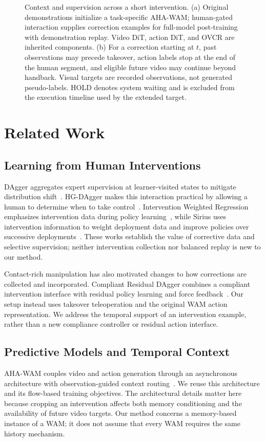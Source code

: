 \documentclass[letterpaper,10pt,conference]{ieeeconf}
\begin{document}
\begin{figure}[t]
\centering

\caption{Context and supervision across a short intervention. (a) Original demonstrations initialize a task-specific AHA-WAM; human-gated interaction supplies correction examples for full-model post-training with demonstration replay. Video DiT, action DiT, and OVCR are inherited components. (b) For a correction starting at $t$, past observations may precede takeover, action labels stop at the end of the human segment, and eligible future video may continue beyond handback. Visual targets are recorded observations, not generated pseudo-labels. HOLD denotes system waiting and is excluded from the execution timeline used by the extended target.}
\label{fig:method}
\end{figure}

\section{Related Work}
\subsection{Learning from Human Interventions}
DAgger aggregates expert supervision at learner-visited states to mitigate distribution shift~\cite{dagger}. HG-DAgger makes this interaction practical by allowing a human to determine when to take control~\cite{hgdagger}. Intervention Weighted Regression emphasizes intervention data during policy learning~\cite{iwr}, while Sirius uses intervention information to weight deployment data and improve policies over successive deployments~\cite{sirius}. These works establish the value of corrective data and selective supervision; neither intervention collection nor balanced replay is new to our method.

Contact-rich manipulation has also motivated changes to how corrections are collected and incorporated. Compliant Residual DAgger combines a compliant intervention interface with residual policy learning and force feedback~\cite{crdagger}. Our setup instead uses takeover teleoperation and the original WAM action representation. We address the temporal support of an intervention example, rather than a new compliance controller or residual action interface.

\subsection{Predictive Models and Temporal Context}
AHA-WAM couples video and action generation through an asynchronous architecture with observation-guided context routing~\cite{ahawam}. We reuse this architecture and its flow-based training objectives. The architectural details matter here because cropping an intervention affects both memory conditioning and the availability of future video targets. Our method concerns a memory-based instance of a WAM; it does not assume that every WAM requires the same history mechanism.
\end{document}
